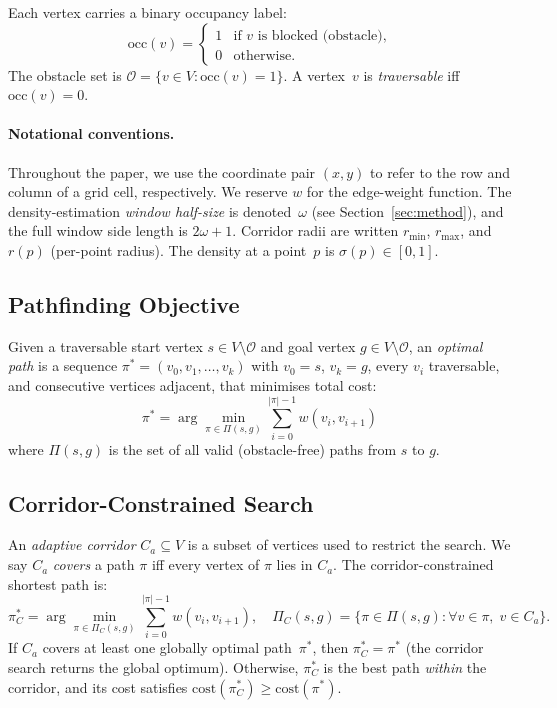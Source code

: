 \documentclass[journal]{IEEEtran}
\begin{document}
\noindent
Each vertex carries a binary occupancy label:
\begin{equation}
    \mathrm{occ}(v) = \begin{cases} 1 & \text{if } v \text{ is blocked (obstacle),} \\ 0 & \text{otherwise.} \end{cases}
\end{equation}
The obstacle set is $\mathcal{O} = \{v \in V : \mathrm{occ}(v) = 1\}$.
A vertex~$v$ is \emph{traversable} iff $\mathrm{occ}(v) = 0$.

\paragraph{Notational conventions.}
Throughout the paper, we use the coordinate pair $(x, y)$ to refer to the row and column of a grid cell, respectively.
We reserve $w$ for the edge-weight function.
The density-estimation \emph{window half-size} is denoted~$\omega$ (see Section~\ref{sec:method}), and the full window side length is $2\omega+1$.
Corridor radii are written $r_{\min}$, $r_{\max}$, and $r(p)$ (per-point radius).
The density at a point~$p$ is $\sigma(p) \in [0,1]$.

\subsection{Pathfinding Objective}

Given a traversable start vertex $s \in V \setminus \mathcal{O}$ and goal vertex $g \in V \setminus \mathcal{O}$, an \emph{optimal path} is a sequence $\pi^{*} = (v_0, v_1, \ldots, v_k)$ with $v_0 = s$, $v_k = g$, every $v_i$ traversable, and consecutive vertices adjacent, that minimises total cost:
\begin{equation}
    \pi^{*} = \arg\min_{\pi \in \Pi(s,g)} \sum_{i=0}^{|\pi|-1} w(v_i, v_{i+1})
\end{equation}
where $\Pi(s,g)$ is the set of all valid (obstacle-free) paths from $s$ to $g$.

\subsection{Corridor-Constrained Search}

An \emph{adaptive corridor} $C_a \subseteq V$ is a subset of vertices used to restrict the search.
We say $C_a$ \emph{covers} a path $\pi$ iff every vertex of $\pi$ lies in $C_a$.
The corridor-constrained shortest path is:
\begin{equation}
    \pi^{*}_C = \arg\min_{\pi \in \Pi_C(s,g)} \sum_{i=0}^{|\pi|-1} w(v_i, v_{i+1}), \quad
    \Pi_C(s,g) = \{\pi \in \Pi(s,g) : \forall v \in \pi,\; v \in C_a\}.
\end{equation}
If $C_a$ covers at least one globally optimal path~$\pi^{*}$, then $\pi^{*}_C = \pi^{*}$ (the corridor search returns the global optimum).
Otherwise, $\pi^{*}_C$ is the best path \emph{within} the corridor, and its cost satisfies $\mathrm{cost}(\pi^{*}_C) \geq \mathrm{cost}(\pi^{*})$.
\end{document}
